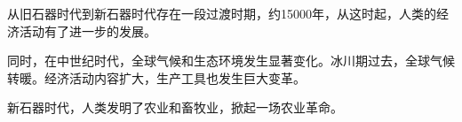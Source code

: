 从旧石器时代到新石器时代存在一段过渡时期，约15000年，从这时起，人类的经济活动有了进一步的发展。

同时，在中世纪时代，全球气候和生态环境发生显著变化。冰川期过去，全球气候转暖。经济活动内容扩大，生产工具也发生巨大变革。

新石器时代，人类发明了农业和畜牧业，掀起一场农业革命。


























